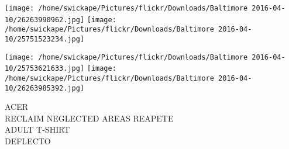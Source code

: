 \documentclass[10pt,letterpaper]{article}
\begin{document}
\texttt{[image: /home/swickape/Pictures/flickr/Downloads/Baltimore 2016-04-10/26263990962.jpg]}
\texttt{[image: /home/swickape/Pictures/flickr/Downloads/Baltimore 2016-04-10/25751523234.jpg]}

\texttt{[image: /home/swickape/Pictures/flickr/Downloads/Baltimore 2016-04-10/25753621633.jpg]}
\texttt{[image: /home/swickape/Pictures/flickr/Downloads/Baltimore 2016-04-10/26263985392.jpg]}

ACER\\
RECLAIM NEGLECTED AREAS REAPETE\\
ADULT T{-}SHIRT\\
DEFLECTO
\pagebreak
\end{document}

